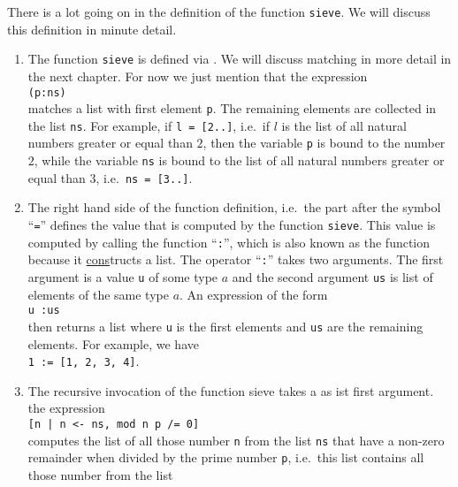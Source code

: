 \begin{enumerate}[(a)]
  There is a lot going on in the definition of the function \texttt{sieve}.  We will discuss this definition
  in minute detail.
  \begin{enumerate}[1.]
  \item The function \texttt{sieve} is defined via .  We will discuss matching in more detail in
    the next chapter.  For now we just mention that the expression
    \\[0.2cm]
    \hspace*{1.3cm}
    \texttt{(p:ns)}
    \\[0.2cm]
    matches a list with first element \texttt{p}.  The remaining elements are collected in the list
    \texttt{ns}.  For example, if \texttt{l = [2..]}, i.e.~if $l$ is the list of all natural numbers greater or
    equal than $2$, then the variable \texttt{p} is bound to the number $2$, while the variable \texttt{ns} is
    bound to the list of all natural numbers greater or equal than $3$, i.e.~\texttt{ns = [3..]}.
  \item The right hand side of the function definition, i.e.~the part after the symbol ``\texttt{=}'' defines the
    value that is computed by the function \texttt{sieve}.  This value is computed by calling the function
    ``\texttt{:}'', which is also known as the  function because it \underline{cons}tructs a list.
    The operator ``\texttt{:}'' takes two arguments.  The first argument is a value \texttt{u} of some type $a$
    and the second argument \texttt{us} is list of elements of the same type $a$.  An expression of the form
    \\[0.2cm]
    \hspace*{1.3cm}
    \texttt{u :\;us}
    \\[0.2cm]
    then returns a list where \texttt{u} is the first elements and \texttt{us} are the remaining elements.
    For example, we have
    \\[0.2cm]
    \hspace*{1.3cm}
    \texttt{1 :\;[2, 3, 4] = [1, 2, 3, 4]}.
  \item The recursive invocation of the function sieve takes a  as ist first argument.
    the expression
    \\[0.2cm]
    \hspace*{1.3cm}
    \texttt{[n | n <- ns, mod n p /= 0]}
    \\[0.2cm]
    computes the list of all those number \texttt{n} from the list \texttt{ns} that have a non-zero remainder
    when divided by the prime number \texttt{p}, i.e.~this list contains all those number from the list

\end{enumerate}
\end{enumerate}
